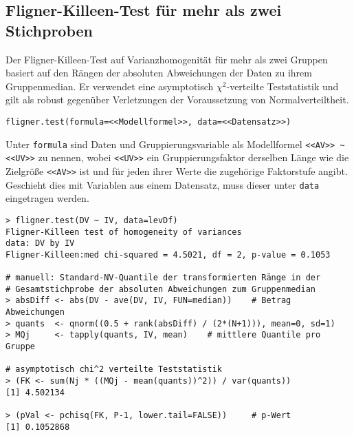 \subsection{Fligner-Killeen-Test für mehr als zwei Stichproben}
\label{sec:fligner}

Der Fligner-Killeen-Test auf Varianzhomogenität für mehr als zwei Gruppen basiert auf den Rängen der absoluten Abweichungen der Daten zu ihrem Gruppenmedian. Er verwendet eine asymptotisch $\chi^{2}$-verteilte Teststatistik und gilt als robust gegenüber Verletzungen der Voraussetzung von Normalverteiltheit.
\begin{lstlisting}
fligner.test(formula=<<Modellformel>>, data=<<Datensatz>>)
\end{lstlisting}

Unter \lstinline!formula! sind Daten und Gruppierungsvariable als Modellformel \lstinline!<<AV>> ~ <<UV>>! zu nennen, wobei \lstinline!<<UV>>! ein Gruppierungsfaktor derselben Länge wie die Zielgröße \lstinline!<<AV>>! ist und für jeden ihrer Werte die zugehörige Faktorstufe angibt. Geschieht dies mit Variablen aus einem Datensatz, muss dieser unter \lstinline!data! eingetragen werden.

\begin{lstlisting}
> fligner.test(DV ~ IV, data=levDf)
Fligner-Killeen test of homogeneity of variances
data: DV by IV
Fligner-Killeen:med chi-squared = 4.5021, df = 2, p-value = 0.1053

# manuell: Standard-NV-Quantile der transformierten Ränge in der
# Gesamtstichprobe der absoluten Abweichungen zum Gruppenmedian
> absDiff <- abs(DV - ave(DV, IV, FUN=median))    # Betrag Abweichungen
> quants  <- qnorm((0.5 + rank(absDiff) / (2*(N+1))), mean=0, sd=1)
> MQj     <- tapply(quants, IV, mean)    # mittlere Quantile pro Gruppe

# asymptotisch chi^2 verteilte Teststatistik
> (FK <- sum(Nj * ((MQj - mean(quants))^2)) / var(quants))
[1] 4.502134

> (pVal <- pchisq(FK, P-1, lower.tail=FALSE))     # p-Wert
[1] 0.1052868
\end{lstlisting}

